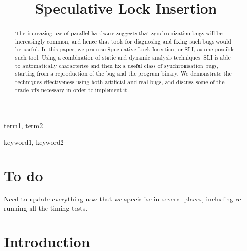 \documentclass[10pt,twocolumn,preprint,natbib,authoryear]{sigplanconf}
\begin{document}
\copyrightdata{[to be supplied]} 


\title{Speculative Lock Insertion}

\authorinfo{}{}{}

\maketitle

\begin{abstract}

The increasing use of parallel hardware suggests that synchronisation
bugs will be increasingly common, and hence that tools for diagnosing
and fixing such bugs would be useful.  In this paper, we propose
Speculative Lock Insertion, or SLI, as one possible such tool.  Using
a combination of static and dynamic analysis techniques, SLI is able
to automatically characterise and then fix a useful class of
synchronisation bugs, starting from a reproduction of the bug and the
program binary.  We demonstrate the techniques effectiveness using
both artificial and real bugs, and discuss some of the trade-offs
necessary in order to implement it.

\end{abstract}


\terms
term1, term2

\keywords
keyword1, keyword2

\section{To do}

Need to update everything now that we specialise in several places,
including re-running all the timing tests.

\section{Introduction}
\end{document}

